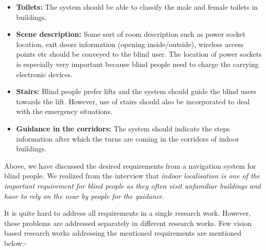 \begin{itemize}
\item \textbf{Toilets:}
The system should be able to classify the male 
and female toilets in buildings. 

\item \textbf{Scene description:}
Some sort of room description such as power socket location, 
exit doors information (opening inside/outside), 
wireless access points etc should be conveyed to the blind user. 
The location of power sockets is especially very 
important because blind people need to charge 
the carrying electronic devices. 

\item \textbf{Stairs:}
Blind people prefer lifts and the system 
should guide the blind users towards the lift. 
However, use of stairs should also be incorporated 
to deal with the emergency situations. 

\item \textbf{Guidance in the corridors:}
The system should indicate the steps 
information after which the turns are coming 
in the corridors of indoor buildings. 

\end{itemize}

Above, we have discussed the desired requirements from 
a navigation system for blind people. We realized from 
the interview that \emph{indoor localisation is one 
of the important requirement for blind people 
as they often visit unfamiliar buildings 
and have to rely on the near by people 
for the guidance.} 

It is quite hard to address all 
requirements in a single research work. 
However, these problems are addressed separately in 
different research works. Few vision based research works 
addressing the mentioned requirements are mentioned below:-

